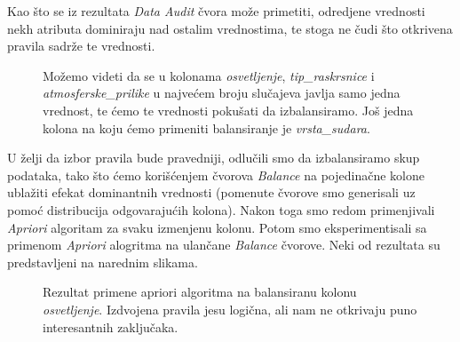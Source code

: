 \documentclass[a4paper,10pt]{article}
\begin{document}
Kao što se iz rezultata \textit{Data Audit} čvora može primetiti, odredjene vrednosti nekh atributa dominiraju nad ostalim vrednostima, te stoga ne
čudi što otkrivena pravila sadrže te vrednosti. 

\begin{figure}[!h]
 \centering
 \label{fig:data_audit}
 \caption{Možemo videti da se u kolonama \textit{osvetljenje}, \textit{tip\_raskrsnice} i \textit{atmosferske\_prilike} u 
 najvećem broju slučajeva javlja samo jedna vrednost, te ćemo te vrednosti pokušati da izbalansiramo. Još jedna kolona na koju ćemo 
 primeniti balansiranje je \textit{vrsta\_sudara}.}
\end{figure}

U želji da izbor pravila bude pravedniji, odlučili smo da izbalansiramo skup podataka, tako što 
ćemo korišćenjem čvorova \textit{Balance} na pojedinačne kolone ublažiti efekat dominantnih vrednosti (pomenute čvorove
smo generisali uz pomoć distribucija odgovarajućih kolona). Nakon toga smo redom primenjivali \textit{Apriori}
algoritam za svaku izmenjenu kolonu. Potom smo eksperimentisali sa primenom \textit{Apriori} alogritma na ulančane \textit{Balance} čvorove. 
Neki od rezultata su predstavljeni na narednim slikama.

\begin{figure}[!h]
 \centering
 \caption{Rezultat primene apriori algoritma na balansiranu kolonu \textit{osvetljenje}. Izdvojena pravila jesu logična, ali nam 
 ne otkrivaju puno interesantnih zaključaka.}
\end{figure}
\end{document}
